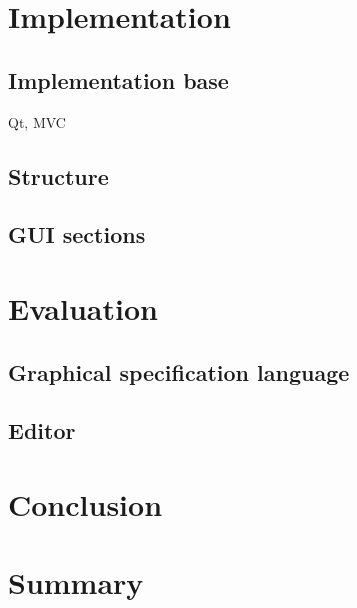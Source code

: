 \documentclass[twoside, openright, 12pt]{book}
\begin{document}
\cleardoublepage
\chapter{Implementation}
\label{implementation}
	
	
\section{Implementation base}
\label{implementation_base}
Qt, MVC

\section{Structure}
\label{implementation_structure}
	
	
\section{GUI sections}
\label{implementation_sections}




\cleardoublepage
\chapter{Evaluation}
\label{evaluation}


\section{Graphical specification language}
\label{evaluation_gsl}


\section{Editor}
\label{evaluation_editor}


\cleardoublepage
\chapter{Conclusion}
\label{conclusion}
\blindtext



\cleardoublepage
\chapter{Summary}
\label{summary}
\blindtext







\cleardoublepage
\DeclareRobustCommand{\citeext}[1]{\citeauthor{#1}~\cite{#1}}




\end{document}

